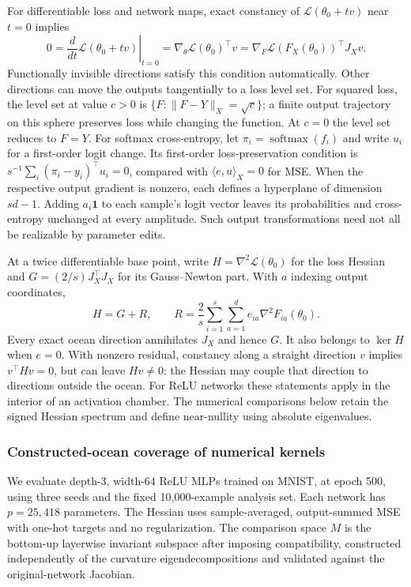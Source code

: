 For differentiable loss and network maps, exact constancy of $\mathcal L(\theta_0+tv)$ near $t=0$ implies
\[
 0=\left.\frac{d}{dt}\mathcal L(\theta_0+tv)\right|_{t=0}
   =\nabla_\theta\mathcal L(\theta_0)^\top v
   =\nabla_F\mathcal L(F_X(\theta_0))^\top J_Xv.
\]
Functionally invisible directions satisfy this condition automatically. Other directions can move the outputs tangentially to a loss level set. For squared loss, the level set at value $c>0$ is $\{F:\|F-Y\|_X=\sqrt c\}$; a finite output trajectory on this sphere preserves loss while changing the function. At $c=0$ the level set reduces to $F=Y$. For softmax cross-entropy, let $\pi_i=\operatorname{softmax}(f_i)$ and write $u_i$ for a first-order logit change. Its first-order loss-preservation condition is $s^{-1}\sum_i(\pi_i-y_i)^\top u_i=0$, compared with $\langle e,u\rangle_X=0$ for MSE. When the respective output gradient is nonzero, each defines a hyperplane of dimension $sd-1$.  Adding $a_i\mathbf1$ to each sample's logit vector leaves its probabilities and cross-entropy unchanged at every amplitude. Such output transformations need not all be realizable by parameter edits. 

At a twice differentiable base point, write $H=\nabla^2\mathcal L(\theta_0)$ for the loss Hessian and $G=(2/s)J_X^\top J_X$ for its Gauss--Newton part. With $a$ indexing output coordinates,
\begin{equation}
 H=G+R,\qquad
 R=\frac{2}{s}\sum_{i=1}^s\sum_{a=1}^d e_{ia}\nabla^2 F_{ia}(\theta_0).
 \label{eq:application-hessian}
\end{equation}
Every exact ocean direction annihilates $J_X$ and hence $G$. It also belongs to $\ker H$ when $e=0$. With nonzero residual, constancy along a straight direction $v$ implies $v^\top Hv=0$, but can leave $Hv\ne0$: the Hessian may couple that direction to directions outside the ocean. For ReLU networks these statements apply in the interior of an activation chamber. The numerical comparisons below retain the signed Hessian spectrum and define near-nullity using absolute eigenvalues.

\subsubsection{Constructed-ocean coverage of numerical kernels}
We evaluate depth-3, width-64 ReLU MLPs trained on MNIST, at epoch 500, using three seeds and the fixed 10,000-example analysis set. Each network has $p=25{,}418$ parameters. The Hessian uses sample-averaged, output-summed MSE with one-hot targets and no regularization. The comparison space $M$ is the bottom-up layerwise invariant subspace after imposing compatibility, constructed independently of the curvature eigendecompositions and validated against the original-network Jacobian.

